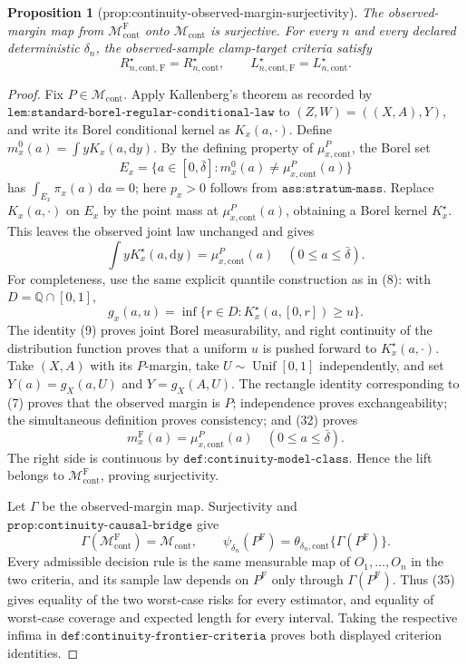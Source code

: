 \documentclass{article}
\newtheorem{proposition}{Proposition}
\begin{document}
\begin{proposition}[prop:continuity-observed-margin-surjectivity]\label{prop:continuity-observed-margin-surjectivity}
The observed-margin map from \(\mathcal M_{\mathrm{cont}}^{\mathrm F}\) onto \(\mathcal M_{\mathrm{cont}}\) is surjective.  For every \(n\) and every declared deterministic \(\delta_n\), the observed-sample clamp-target criteria satisfy
\[
 R_{n,\mathrm{cont},\mathrm F}^\star=R_{n,\mathrm{cont}}^\star,
 \qquad
 L_{n,\mathrm{cont},\mathrm F}^\star=L_{n,\mathrm{cont}}^\star.
\]
\end{proposition}
\begin{proof}
Fix \(P\in\mathcal M_{\mathrm{cont}}\).  Apply Kallenberg's theorem as recorded by \(\texttt{lem:standard-borel-regular-conditional-law}\) to \((Z,W)=((X,A),Y)\), and write its Borel conditional kernel as \(K_x(a,\cdot)\).  Define \(m_x^0(a)=\int yK_x(a,\mathrm dy)\).  By the defining property of \(\mu_{x,\mathrm{cont}}^P\), the Borel set
\[
 E_x=\{a\in[0,\bar\delta]:m_x^0(a)\ne\mu_{x,\mathrm{cont}}^P(a)\} \tag{31}
\]
has \(\int_{E_x}\pi_x(a)\,\mathrm da=0\); here \(p_x>0\) follows from \(\texttt{ass:stratum-mass}\).  Replace \(K_x(a,\cdot)\) on \(E_x\) by the point mass at \(\mu_{x,\mathrm{cont}}^P(a)\), obtaining a Borel kernel \(K_x^\star\).  This leaves the observed joint law unchanged and gives
\[
 \int yK_x^\star(a,\mathrm dy)=\mu_{x,\mathrm{cont}}^P(a)
 \quad(0\leq a\leq\bar\delta). \tag{32}
\]
For completeness, use the same explicit quantile construction as in (8): with \(D=\mathbb Q\cap[0,1]\),
\[
 g_x(a,u)=\inf\{r\in D:K_x^\star(a,[0,r])\geq u\}. \tag{33}
\]
The identity (9) proves joint Borel measurability, and right continuity of the distribution function proves that a uniform \(u\) is pushed forward to \(K_x^\star(a,\cdot)\).  Take \((X,A)\) with its \(P\)-margin, take \(U\sim\operatorname{Unif}[0,1]\) independently, and set \(Y(a)=g_X(a,U)\) and \(Y=g_X(A,U)\).  The rectangle identity corresponding to (7) proves that the observed margin is \(P\); independence proves exchangeability; the simultaneous definition proves consistency; and (32) proves
\[
 m_x^{\mathrm F}(a)=\mu_{x,\mathrm{cont}}^P(a)
 \quad(0\leq a\leq\bar\delta). \tag{34}
\]
The right side is continuous by \(\texttt{def:continuity-model-class}\).  Hence the lift belongs to \(\mathcal M_{\mathrm{cont}}^{\mathrm F}\), proving surjectivity.

Let \(\Gamma\) be the observed-margin map.  Surjectivity and \(\texttt{prop:continuity-causal-bridge}\) give
\[
 \Gamma(\mathcal M_{\mathrm{cont}}^{\mathrm F})=\mathcal M_{\mathrm{cont}},
 \qquad
 \psi_{\delta_n}(P^{\mathrm F})
 =\theta_{\delta_n,\mathrm{cont}}\{\Gamma(P^{\mathrm F})\}. \tag{35}
\]
Every admissible decision rule is the same measurable map of \(O_1,\ldots,O_n\) in the two criteria, and its sample law depends on \(P^{\mathrm F}\) only through \(\Gamma(P^{\mathrm F})\).  Thus (35) gives equality of the two worst-case risks for every estimator, and equality of worst-case coverage and expected length for every interval.  Taking the respective infima in \(\texttt{def:continuity-frontier-criteria}\) proves both displayed criterion identities.
\end{proof}
\end{document}
